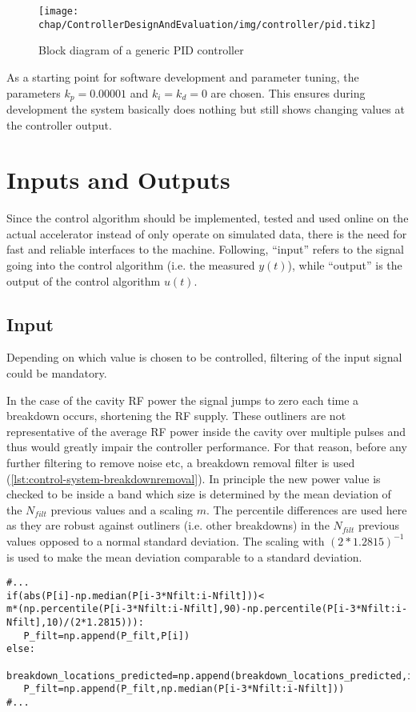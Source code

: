\begin{figure}[tb]
	\centering
	\texttt{[image: chap/ControllerDesignAndEvaluation/img/controller/pid.tikz]}
	\caption{Block diagram of a generic PID controller}
	\label{fig:own-work-pid-block}
\end{figure}

As a starting point for software development and parameter tuning, the parameters $k_p=0.00001$ and $k_i=k_d=0$ are chosen. This ensures during development the system basically does nothing but still shows changing values at the controller output.

\section{Inputs and Outputs}
Since the control algorithm should be implemented, tested and used online on the actual accelerator instead of only operate on simulated data, there is the need for fast and reliable interfaces to the machine.
Following, ``input'' refers to the signal going into the control algorithm (i.e. the measured $y(t)$), while ``output'' is the output of the control algorithm $u(t)$.

\subsection{Input}
Depending on which value is chosen to be controlled, filtering of the input signal could be mandatory.

In the case of the cavity RF power the signal jumps to zero each time a breakdown occurs, shortening the RF supply. These outliners are not representative of the average RF power inside the cavity over multiple pulses and thus would greatly impair the controller performance. For that reason, before any further filtering to remove noise etc, a breakdown removal filter is used (\autoref{lst:control-system-breakdownremoval}). In principle the new power value is checked to be inside a band which size is determined by the mean deviation of the $N_{filt}$ previous values and a scaling $m$. The percentile differences are used here as they are robust against outliners (i.e. other breakdowns) in the $N_{filt}$ previous values opposed to a normal standard deviation. The scaling with $(2*1.2815)^{-1}$ is used to make the mean deviation comparable to a standard deviation.

\begin{lstlisting}[style=python,caption = Breakdown removal, label = lst:control-system-breakdownremoval]
#...
if(abs(P[i]-np.median(P[i-3*Nfilt:i-Nfilt]))<
m*(np.percentile(P[i-3*Nfilt:i-Nfilt],90)-np.percentile(P[i-3*Nfilt:i-Nfilt],10)/(2*1.2815))):
   P_filt=np.append(P_filt,P[i])
else:
   breakdown_locations_predicted=np.append(breakdown_locations_predicted,i)
   P_filt=np.append(P_filt,np.median(P[i-3*Nfilt:i-Nfilt]))
#...
\end{lstlisting}




